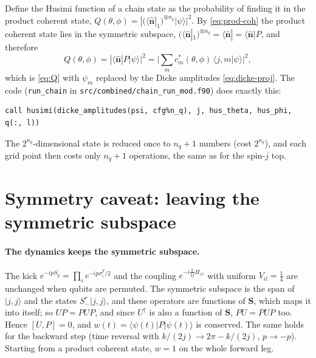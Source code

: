 \documentclass[11pt,a4paper]{article}
\newcommand{\vS}{\bm{S}}
\newcommand{\vn}{\hat{\bm n}}
\begin{document}
Define the Husimi function of a chain state as the probability of finding it in the product coherent state,
$Q(\theta,\phi) = |(\langle\vn|_1)^{\otimes n_q}|\psi\rangle|^2$. By \eqref{eq:prod-coh} the product coherent state
lies in the symmetric subspace, $(\langle\vn|_1)^{\otimes n_q} = \langle\vn| = \langle\vn|P$, and therefore
\begin{equation}\label{eq:Q-chain}
  Q(\theta,\phi) = |\langle\vn|P|\psi\rangle|^2 = \Big|\sum_m c_m^*(\theta,\phi)\,\langle j,m|\psi\rangle\Big|^2 ,
\end{equation}
which is \eqref{eq:Q} with $\psi_m$ replaced by the Dicke amplitudes \eqref{eq:dicke-proj}. The code (\texttt{run\_chain}
in \texttt{src/combined/chain\_run\_mod.f90}) does exactly this:
\begin{lstlisting}
call husimi(dicke_amplitudes(psi, cfg%n_q), j, hus_theta, hus_phi, q(:, l))
\end{lstlisting}
The $2^{n_q}$-dimensional state is reduced once to $n_q+1$ numbers (cost $2^{n_q}$), and each grid point then costs only
$n_q+1$ operations, the same as for the spin-$j$ top.

\section{Symmetry caveat: leaving the symmetric subspace}\label{sec:caveat}

\paragraph{The dynamics keeps the symmetric subspace.} The kick $e^{-ipS_y} = \prod_ie^{-ip\sigma^y_i/2}$ and the
coupling $e^{-i\frac{k}{2j}H_{zz}}$ with uniform $V_{il} = \frac14$ are unchanged when qubits are permuted. The
symmetric subspace is the span of $|j,j\rangle$ and the states $S_-^r|j,j\rangle$, and these operators are functions of
$\vS$, which maps it into itself; so $UP = PUP$, and since $U^\dagger$ is also a function of $\vS$, $PU = PUP$ too.
Hence $[U,P] = 0$, and $w(t) = \langle\psi(t)|P|\psi(t)\rangle$ is conserved. The same holds for the backward step (time
reversal with $k/(2j)\to2\pi-k/(2j)$, $p\to-p$). Starting from a product coherent state, $w = 1$ on the whole forward leg.
\end{document}
